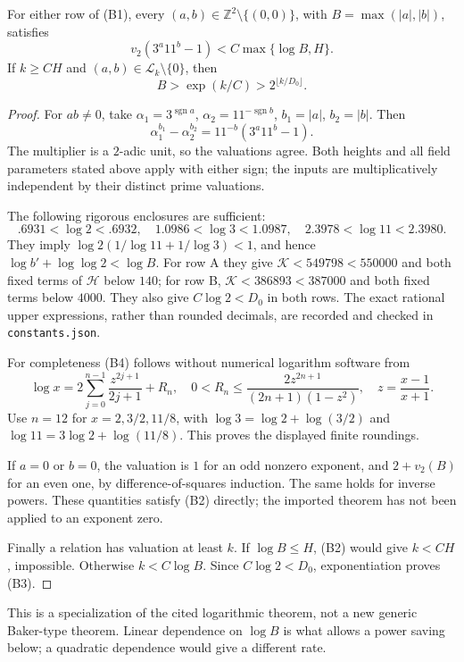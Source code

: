 \begin{theorem}\label{thm:height}
For either row of (B1), every $(a,b)\in\mathbb Z^2\setminus\{(0,0)\}$,
with $B=\max(|a|,|b|)$, satisfies
\[
 \boxed{v_2(3^a11^b-1)<C\max\{\log B,H\}.}                 \tag{B2}
\]
If $k\ge CH$ and $(a,b)\in\mathcal L_k\setminus\{0\}$, then
\[
 \boxed{B>\exp(k/C)>2^{\lfloor k/D_0\rfloor}.}             \tag{B3}
\]
\end{theorem}
\begin{proof}
For $ab\ne0$, take
$\alpha_1=3^{\operatorname{sgn}a}$,
$\alpha_2=11^{-\operatorname{sgn}b}$,
$b_1=|a|$, $b_2=|b|$. Then
\[
 \alpha_1^{b_1}-\alpha_2^{b_2}=11^{-b}(3^a11^b-1).
\]
The multiplier is a $2$-adic unit, so the valuations agree. Both heights and
all field parameters stated above apply with either sign; the inputs are
multiplicatively independent by their distinct prime valuations.

The following rigorous enclosures are sufficient:
\[
 .6931<\log2<.6932,\quad1.0986<\log3<1.0987,\quad
 2.3978<\log11<2.3980.                                    \tag{B4}
\]
They imply
$\log2(1/\log11+1/\log3)<1$, and hence
$\log b'+\log\log2<\log B$.
For row A they give $\mathcal K<549798<550000$ and both fixed terms of
$\mathcal H$ below $140$; for row B, $\mathcal K<386893<387000$ and both
fixed terms below $4000$. They also give $C\log2<D_0$ in both rows.
The exact rational upper expressions, rather than rounded decimals, are
recorded and checked in \texttt{constants.json}.

For completeness (B4) follows without numerical logarithm software from
\[
 \log x=2\sum_{j=0}^{n-1}\frac{z^{2j+1}}{2j+1}+R_n,
 \quad0<R_n\le\frac{2z^{2n+1}}{(2n+1)(1-z^2)},\quad z=\frac{x-1}{x+1}.
\]
Use $n=12$ for $x=2,3/2,11/8$, with
$\log3=\log2+\log(3/2)$ and $\log11=3\log2+\log(11/8)$.
This proves the displayed finite roundings.

If $a=0$ or $b=0$, the valuation is $1$ for an odd nonzero exponent, and
$2+v_2(B)$ for an even one, by difference-of-squares induction. The same holds
for inverse powers. These quantities satisfy (B2) directly; the imported theorem
has not been applied to an exponent zero.

Finally a relation has valuation at least $k$. If $\log B\le H$, (B2)
would give $k<CH$, impossible. Otherwise $k<C\log B$.
Since $C\log2<D_0$, exponentiation proves (B3).
\end{proof}

This is a specialization of the cited logarithmic theorem, not a new generic
Baker-type theorem. Linear dependence on $\log B$ is what allows a power
saving below; a quadratic dependence would give a different rate.


